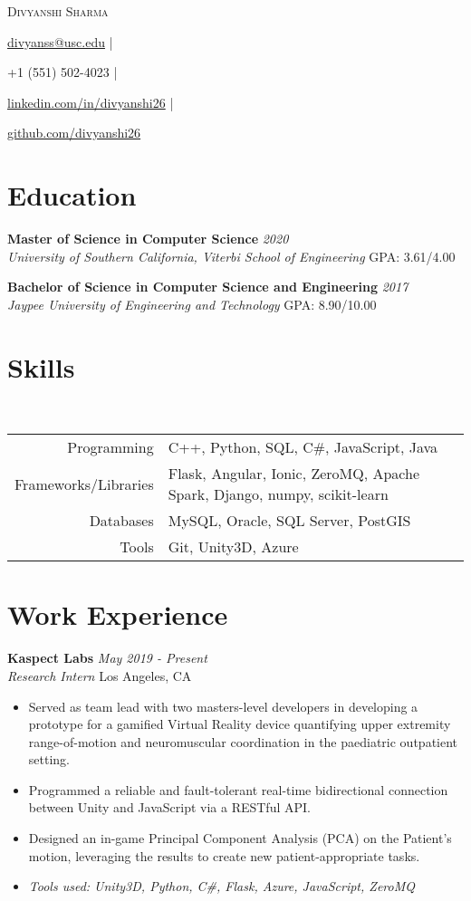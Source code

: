\documentclass[letterpaper,10pt]{article}
\makeatletter
\newcommand{\organization}[4]{
    \vspace{1.5pt}
    \textbf{#1} \hfill{\emph{#2}} \\
    \emph{#3} \hfill{#4} \\
    \vspace{3pt}
}
\newcommand{\toolsused}[1]{
    \vspace{1.5pt}
    \emph{#1}\\
    \vspace{3pt}
}
\newcommand{\skills}[4]{
    \vspace{-2pt}
    \ \ \ \ \ \ \ \ \ \ \ 
    \begin{tabular}{r!{\color{burgundy}\vrule}l}
          Programming & #1 \\
          Frameworks/Libraries & #2 \\
          Databases & #3 \\
          Tools & #4
    \end{tabular}
    \vspace{4pt}
}
\newcommand{\bulletsBegin}{
    \vspace{1pt}
    \begin{minipage}{17.6cm}
    \begin{itemize}[leftmargin=0.6cm]
    \setlength\itemsep{-0.1em}
}
\newcommand{\bulletsEnd}{
    \end{itemize}\vspace{0pt}
    \end{minipage}
}
\newcommand{\myEmail}[1]{
    \href{mailto:divyanss@usc.edu}{#1} |
}
\newcommand{\myPhone}[1]{
    {#1} |
}
\newcommand{\mySite}[1]{
    \href{https://linkedin.com/in/divyanshi26}{#1} |
}
\newcommand{\myGitHub}[1]{
    \href{https://github.com/divyanshi26}{#1}
}
\newcommand{\myName}[5]{
    \begin{center}
        {\huge{\color{burgundy}\scshape{#1}}} \\
        \vspace{6pt}
        \myEmail{#2}
        \myPhone{#3}
        \mySite{#4}
        \myGitHub{#5}
    \end{center}
    \vspace{-4pt}
}
\makeatother
\begin{document}
    \myName{Divyanshi Sharma}{divyanss@usc.edu}{+1 (551) 502-4023}{linkedin.com/in/divyanshi26}{github.com/divyanshi26}

    \section{Education}
        
    \organization{Master of Science in Computer Science}{2020}
        {University of Southern California, Viterbi School of Engineering}{GPA: 3.61/4.00}

	\organization{Bachelor of Science in Computer Science and Engineering}{2017}
        {Jaypee University of Engineering and Technology}{GPA: 8.90/10.00}
        \vspace{5pt}
    
    
    \section{Skills}
    
    \skills
        {C++, Python, SQL, C\#, JavaScript, Java}  %
        {Flask, Angular, Ionic, ZeroMQ, Apache Spark, Django, numpy, scikit-learn}  %
        {MySQL, Oracle, SQL Server, PostGIS}  %
        {Git, Unity3D, Azure}  %


    \section{Work Experience}

        \organization{Kaspect Labs}{May 2019 - Present}
        {Research Intern}{Los Angeles, CA}
        \bulletsBegin
            \item Served as team lead with two masters-level developers in developing a prototype for a gamified Virtual Reality device quantifying upper extremity range-of-motion and neuromuscular coordination in the paediatric outpatient setting.
            \vspace{-2pt}
            \item Programmed a reliable and fault-tolerant real-time bidirectional connection between Unity and JavaScript via a RESTful API.
            \vspace{-2pt}
            \item Designed an in-game Principal Component Analysis (PCA) on the Patient’s motion, leveraging the results to create new patient-appropriate tasks.
            \vspace{-2pt}
            \item \textit{Tools used: Unity3D, Python, C\#, Flask, Azure, JavaScript, ZeroMQ}
        \bulletsEnd
        
\end{document}
